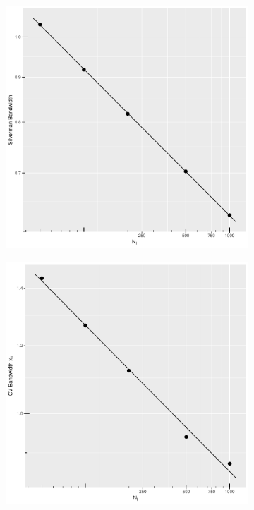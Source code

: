 \begin{figure}[htbp]
\begin{subfigure}[t]{0.195\textwidth}
    \end{subfigure}
    \begin{subfigure}[t]{0.195\textwidth}
        \centering
        \captionsetup{width=.8\linewidth}%
        \includegraphics[width=\textwidth]{results/by_h_per_mu/silverman_bandwidth_vs_mu.pdf}
    \end{subfigure}
    \begin{subfigure}[t]{0.195\textwidth}
        \centering
        \captionsetup{width=.8\linewidth}%
        \includegraphics[width=\textwidth]{results/by_h_per_mu/cv_bandwidth_x1_vs_mu.pdf}

\end{subfigure}
\end{figure}
